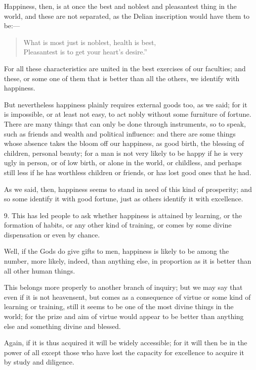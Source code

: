Happiness, then, is at once the best and noblest and pleasantest thing
in the world, and these are not separated, as the Delian inscription
would have them to be:---

\begin{verse}
What is most just is noblest, health is best,\\
Pleasantest is to get your heart's desire.''
\end{verse}

\noindent For all these characteristics are united in the best
exercises of our faculties; and these, or some one of them that is
better than all the others, we identify with happiness.

But nevertheless happiness plainly requires external goods too, as we
said; for it is impossible, or at least not easy, to act nobly without
some furniture of fortune. There are many things that can only be done
through instruments, so to speak, such as friends and wealth and
political influence: and there are some things whose absence takes the
bloom off our happiness, as good birth, the blessing of children,
personal beauty; for a man is not very likely to be happy if he is
very ugly in person, or of low birth, or alone in the world, or
childless, and perhaps still less if he has worthless children or
friends, or has lost good ones that he had.

As we said, then, happiness seems to stand in need of this kind of
prosperity; and so some identify it  with good fortune, just
as others identify it with excellence.

9. This has led people to ask whether happiness is attained by
learning, or the formation of habits, or any other kind of training,
or comes by some divine dispensation or even by chance.

Well, if the Gods do give gifts to men, happiness is likely to be
among the number, more likely, indeed, than anything else, in
proportion as it is better than all other human things.

This belongs more properly to another branch of inquiry; but we may
say that even if it is not heavensent, but comes as a consequence of
virtue or some kind of learning or training, still it seems to be one
of the most divine things in the world; for the prize and aim of
virtue would appear to be better than anything else and something
divine and blessed.

Again, if it is thus acquired it will be widely accessible; for it
will then be in the power of all except those who have lost the
capacity for excellence to acquire it by study and diligence.

